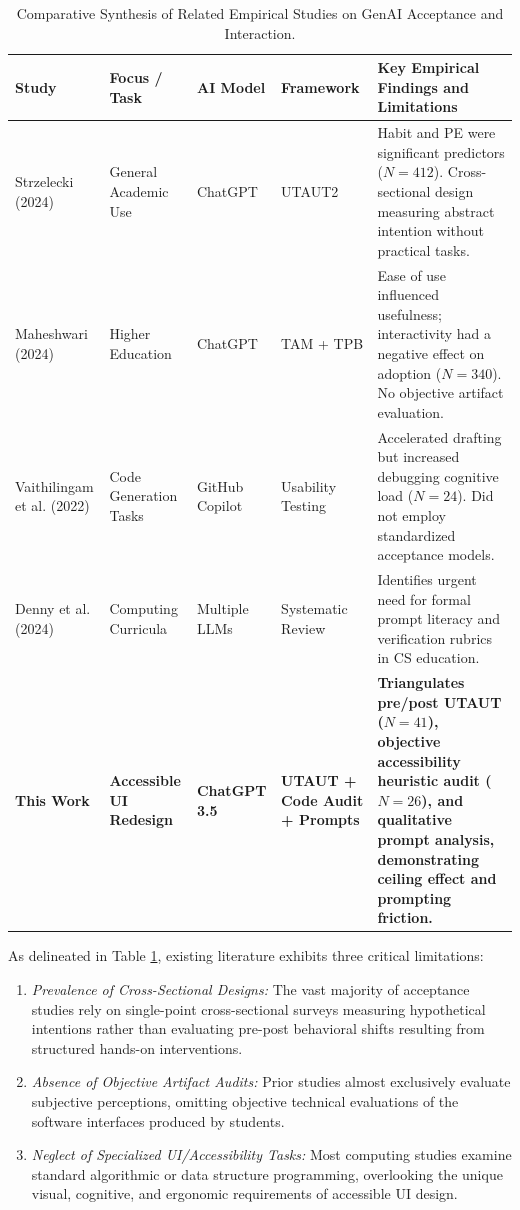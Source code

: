 \documentclass{cleiej}
\begin{document}
\begin{table}[t]
\centering
\caption{Comparative Synthesis of Related Empirical Studies on GenAI Acceptance and Interaction.}
\label{tab:related_work}
\footnotesize
\begin{tabularx}{\textwidth}{p{3.2cm} p{2.2cm} p{2.0cm} p{2.0cm} X}
\toprule
\textbf{Study} & \textbf{Focus / Task} & \textbf{AI Model} & \textbf{Framework} & \textbf{Key Empirical Findings and Limitations} \\
\midrule
Strzelecki (2024) \cite{strzelecki2024students} & General Academic Use & ChatGPT & UTAUT2 & Habit and PE were significant predictors ($N=412$). Cross-sectional design measuring abstract intention without practical tasks. \\
\addlinespace
Maheshwari (2024) \cite{maheshwari2024factors} & Higher Education & ChatGPT & TAM + TPB & Ease of use influenced usefulness; interactivity had a negative effect on adoption ($N=340$). No objective artifact evaluation. \\
\addlinespace
Vaithilingam et al. (2022) \cite{vaithilingam2022expectation} & Code Generation Tasks & GitHub Copilot & Usability Testing & Accelerated drafting but increased debugging cognitive load ($N=24$). Did not employ standardized acceptance models. \\
\addlinespace
Denny et al. (2024) \cite{denny2024computing} & Computing Curricula & Multiple LLMs & Systematic Review & Identifies urgent need for formal prompt literacy and verification rubrics in CS education. \\
\addlinespace
\textbf{This Work} & \textbf{Accessible UI Redesign} & \textbf{ChatGPT 3.5} & \textbf{UTAUT + Code Audit + Prompts} & \textbf{Triangulates pre/post UTAUT ($N=41$), objective accessibility heuristic audit ($N=26$), and qualitative prompt analysis, demonstrating ceiling effect and prompting friction.} \\
\bottomrule
\end{tabularx}
\end{table}

As delineated in Table \ref{tab:related_work}, existing literature exhibits three critical limitations:
\begin{enumerate}[label=(\roman*)]
    \item \textit{Prevalence of Cross-Sectional Designs:} The vast majority of acceptance studies rely on single-point cross-sectional surveys measuring hypothetical intentions rather than evaluating pre-post behavioral shifts resulting from structured hands-on interventions.
    \item \textit{Absence of Objective Artifact Audits:} Prior studies almost exclusively evaluate subjective perceptions, omitting objective technical evaluations of the software interfaces produced by students.
    \item \textit{Neglect of Specialized UI/Accessibility Tasks:} Most computing studies examine standard algorithmic or data structure programming, overlooking the unique visual, cognitive, and ergonomic requirements of accessible UI design.
\end{enumerate}
\end{document}
